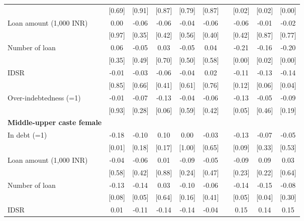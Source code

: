 \begin{table}[htbp]
{\begin{tabular}{rccccccccc}
          & [0.69] & [0.91] & [0.87] & [0.79] & [0.87] &       & [0.02] & [0.02] & [0.00] \\
    \multicolumn{1}{l}{Loan amount (1,000 INR)} & 0.00  & -0.06 & -0.06 & -0.04 & -0.06 &       & -0.06 & -0.01 & -0.02 \\
          & [0.97] & [0.35] & [0.42] & [0.56] & [0.40] &       & [0.42] & [0.87] & [0.77] \\
    \multicolumn{1}{l}{Number of loan } & 0.06  & -0.05 & 0.03  & -0.05 & 0.04  &       & \cellcolor{yellow}-0.21 & \cellcolor{yellow}-0.16 & \cellcolor{yellow}-0.20 \\
          & [0.35] & [0.49] & [0.70] & [0.50] & [0.58] &       & [0.00] & [0.02] & [0.00] \\
    \multicolumn{1}{l}{IDSR} & -0.01 & -0.03 & -0.06 & -0.04 & 0.02  &       & -0.11 & \cellcolor{yellow}-0.13 & \cellcolor{yellow}-0.14 \\
          & [0.85] & [0.66] & [0.41] & [0.61] & [0.76] &       & [0.12] & [0.06] & [0.04] \\
    \multicolumn{1}{l}{Over-indebtedness (=1)} & -0.01 & -0.07 & \cellcolor{yellow}-0.13 & -0.04 & -0.06 &       & \cellcolor{yellow}-0.13 & -0.05 & -0.09 \\
          & [0.93] & [0.28] & [0.06] & [0.59] & [0.42] &       & [0.05] & [0.46] & [0.19] \\
    \midrule
    \multicolumn{1}{l}{\textbf{Middle-upper caste female}} &       &       &       &       &       &       &       &       &  \\
    \multicolumn{1}{l}{In debt (=1)} & \cellcolor{yellow}-0.18 & -0.10 & 0.10  & 0.00  & -0.03 &       & \cellcolor{yellow}-0.13 & -0.07 & -0.05 \\
          & [0.01] & [0.18] & [0.17] & [1.00] & [0.65] &       & [0.09] & [0.33] & [0.53] \\
    \multicolumn{1}{l}{Loan amount (1,000 INR)} & -0.04 & -0.06 & 0.01  & -0.09 & -0.05 &       & -0.09 & 0.09  & 0.03 \\
          & [0.58] & [0.42] & [0.88] & [0.24] & [0.47] &       & [0.23] & [0.22] & [0.64] \\
    \multicolumn{1}{l}{Number of loan } & -0.13 & \cellcolor{yellow}-0.14 & 0.03  & -0.10 & -0.06 &       & -0.14 & \cellcolor{yellow}-0.15 & -0.08 \\
          & [0.08] & [0.05] & [0.64] & [0.16] & [0.41] &       & [0.05] & [0.04] & [0.30] \\
    \multicolumn{1}{l}{IDSR} & 0.01  & -0.11 & \cellcolor{yellow}-0.14 & \cellcolor{yellow}-0.14 & -0.04 &       & \cellcolor{yellow}0.15 & \cellcolor{yellow}0.14 & \cellcolor{yellow}0.15 \\

\end{tabular}}
\end{table}
